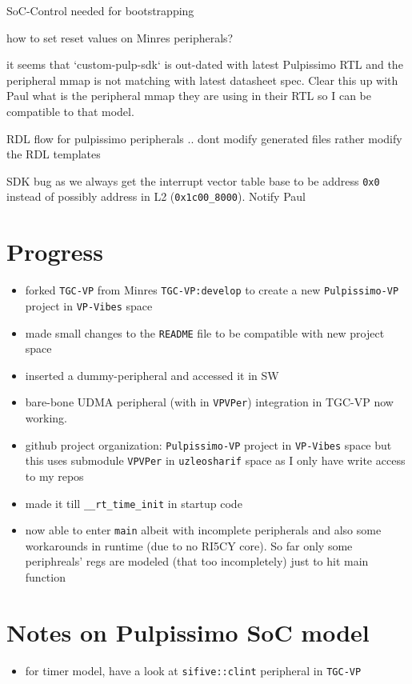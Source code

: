 \documentclass{article}
\newcommand{\cmark}{\ding{51}}%
\newcommand{\done}{\rlap{$\square$}{\raisebox{2pt}{\large\hspace{1pt}\cmark}}%
\hspace{-2.5pt}}
\begin{document}
\begin{todolist}
 \item[\done] SoC-Control needed for bootstrapping
 \item[\done] how to set reset values on Minres peripherals?
 \item[\done] it seems that `custom-pulp-sdk` is out-dated with latest Pulpissimo RTL and the peripheral mmap is not
 matching with latest datasheet spec. Clear this up with Paul what is the peripheral mmap they are using in their RTL
 so I can be compatible to that model.
 \item RDL flow for pulpissimo peripherals .. dont modify generated files rather modify the RDL templates
 \item[\done] SDK bug as we always get the interrupt vector table base to be address \texttt{0x0} instead of possibly
 address in L2 (\texttt{0x1c00\_8000}). Notify Paul
\end{todolist}

\section{Progress}
\begin{itemize}
 \item forked \texttt{TGC-VP} from Minres \texttt{TGC-VP:develop} to create a new \texttt{Pulpissimo-VP} project in
       \texttt{VP-Vibes} space
 \item made small changes to the \texttt{README} file to be compatible with new project space
 \item inserted a dummy-peripheral and accessed it in SW
 \item bare-bone UDMA peripheral (with in \texttt{VPVPer}) integration in TGC-VP now working.
 \item github project organization: \texttt{Pulpissimo-VP} project in \texttt{VP-Vibes} space but this uses
       submodule \texttt{VPVPer} in \texttt{uzleosharif} space as I only have write access to my repos
 \item made it till \texttt{\_\_rt\_time\_init} in startup code
 \item now able to enter \texttt{main} albeit with incomplete peripherals and also some workarounds in runtime (due to no RI5CY core). So far
       only some periphreals' regs are modeled (that too incompletely) just to hit main function
\end{itemize}

\section{Notes on Pulpissimo SoC model}
\begin{itemize}
 \item for timer model, have a look at \texttt{sifive::clint} peripheral in \texttt{TGC-VP}
\end{itemize}
\end{document}
